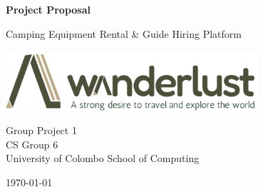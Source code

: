 \begin{titlepage}
	\begin{center}
		\vspace*{1cm}


{\fontsize{30}{30}\selectfont \textbf{Project Proposal}}

    
	

		\vspace{1.5cm}

  {\fontsize{20}{30}\selectfont Camping Equipment Rental \& Guide Hiring Platform}
		

		\vspace{1.5cm}
		\vfill
	\includegraphics[width=0.7\textwidth]{Images/logo.png}
		\vfill

		\vspace{0.8cm}


		Group Project 1\\ CS Group 6\\

	\vspace{0.5\baselineskip}	
	{University of Colombo School of Computing} 
 
    \vspace*{6\baselineskip} 
    \monthyeardate\today 

	\end{center}
\end{titlepage}